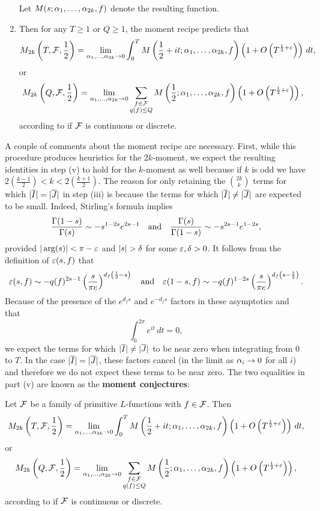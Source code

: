 \begin{enumerate}[label*=(\roman*)]
\[    \]
    Let $M(s;\alpha_{1},\ldots,\alpha_{2k},f)$ denote the resulting function.
    \item Then for any $T \ge 1$ or $Q \ge 1$, the moment recipe predicts that
    \[
      M_{2k}\left(T,\mathcal{F},\frac{1}{2}\right) = \lim_{\alpha_{1},\ldots,\alpha_{2k} \to 0}\int_{0}^{T}M\left(\frac{1}{2}+it;\alpha_{1},\ldots,\alpha_{2k},f\right)\left(1+O\left(T^{\frac{1}{2}+\varepsilon}\right)\right)\,dt,
    \]
    or
    \[
       M_{2k}\left(Q,\mathcal{F},\frac{1}{2}\right) = \lim_{\alpha_{1},\ldots,\alpha_{2k} \to 0}\sum_{\substack{f \in \mathcal{F} \\ q(f) \le Q}}M\left(\frac{1}{2};\alpha_{1},\ldots,\alpha_{2k},f\right)\left(1+O\left(T^{\frac{1}{2}+\varepsilon}\right)\right),
    \]
    according to if $\mathcal{F}$ is continuous or discrete.
  \end{enumerate}

  A couple of comments about the moment recipe are necessary. First, while this procedure produces heuristics for the $2k$-moment, we expect the resulting identities in step (v) to hold for the $k$-moment as well because if $k$ is odd we have $2\left(\frac{k-1}{2}\right) < k < 2\left(\frac{k+1}{2}\right)$. The reason for only retaining the $\binom{2k}{k}$ terms for which $|\overline{I}| = |\overline{J}|$ in step (iii) is because the terms for which $|\overline{I}| \neq |\overline{J}|$ are expected to be small. Indeed, Stirling's formula implies
  \[
    \frac{\Gamma(1-s)}{\Gamma(s)} \sim -s^{1-2s}e^{2s-1} \quad \text{and} \quad \frac{\Gamma(s)}{\Gamma(1-s)} \sim -s^{2s-1}e^{1-2s},
  \]
  provided $|\arg(s)| < \pi-\varepsilon$ and $|s| > \delta$ for some $\varepsilon,\delta > 0$. It follows from the definition of $\varepsilon(s,f)$ that
  \[
    \varepsilon(s,f) \sim -q(f)^{2s-1}\left(\frac{s}{\pi e}\right)^{d_{f}\left(\frac{1}{2}-s\right)} \quad \text{and} \quad \varepsilon(1-s,f) \sim -q(f)^{1-2s}\left(\frac{s}{\pi e}\right)^{d_{f}\left(s-\frac{1}{2}\right)}.
  \]
  Because of the presence of the $e^{d_{f}s}$ and $e^{-d_{f}s}$ factors in these asymptotics and that
  \[
    \int_{0}^{2\pi}e^{it}\,dt = 0,
  \]
  we expect the terms for which $|\overline{I}| \neq |\overline{J}|$ to be near zero when integrating from $0$ to $T$. In the case $|\overline{I}| = |\overline{J}|$, these factors cancel (in the limit as $\alpha_{i} \to 0$ for all $i$) and therefore we do not expect these terms to be near zero. The two equalities in part (v) are known as the \textbf{moment conjectures}:

  \begin{conjecture}
    Let $\mathcal{F}$ be a family of primitive $L$-functions with $f \in \mathcal{F}$. Then
    \[
      M_{2k}\left(T,\mathcal{F},\frac{1}{2}\right) = \lim_{\alpha_{1},\ldots,\alpha_{2k} \to 0}\int_{0}^{T}M\left(\frac{1}{2}+it;\alpha_{1},\ldots,\alpha_{2k},f\right)\left(1+O\left(T^{\frac{1}{2}+\varepsilon}\right)\right)\,dt,
    \]
    or
    \[
       M_{2k}\left(Q,\mathcal{F},\frac{1}{2}\right) = \lim_{\alpha_{1},\ldots,\alpha_{2k} \to 0}\sum_{\substack{f \in \mathcal{F} \\ q(f) \le Q}}M\left(\frac{1}{2};\alpha_{1},\ldots,\alpha_{2k},f\right)\left(1+O\left(T^{\frac{1}{2}+\varepsilon}\right)\right),
    \]
    according to if $\mathcal{F}$ is continuous or discrete.
  \end{conjecture}